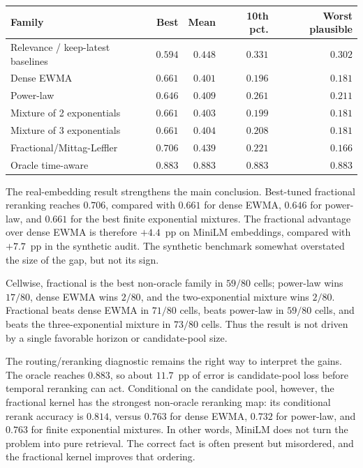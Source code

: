 \documentclass[11pt]{article}
\theoremstyle{plain}
\theoremstyle{definition}
\begin{document}
\begin{center}
\begin{tabular}{@{}lrrrr@{}}
\toprule
Family & Best & Mean & 10th pct. & Worst plausible \\
\midrule
Relevance / keep-latest baselines & $0.594$ & $0.448$ & $0.331$ & $0.302$ \\
Dense EWMA & $0.661$ & $0.401$ & $0.196$ & $0.181$ \\
Power-law & $0.646$ & $0.409$ & $0.261$ & $0.211$ \\
Mixture of 2 exponentials & $0.661$ & $0.403$ & $0.199$ & $0.181$ \\
Mixture of 3 exponentials & $0.661$ & $0.404$ & $0.208$ & $0.181$ \\
Fractional/Mittag-Leffler & $\mathbf{0.706}$ & $0.439$ & $0.221$ & $0.166$ \\
Oracle time-aware & $0.883$ & $0.883$ & $0.883$ & $0.883$ \\
\bottomrule
\end{tabular}
\end{center}

The real-embedding result strengthens the main conclusion.
Best-tuned fractional reranking reaches $0.706$, compared
with $0.661$ for dense EWMA, $0.646$ for power-law, and
$0.661$ for the best finite exponential mixtures.  The
fractional advantage over dense EWMA is therefore
$+4.4$~pp on MiniLM embeddings, compared with $+7.7$~pp in
the synthetic audit.  The synthetic benchmark somewhat
overstated the size of the gap, but not its sign.

Cellwise, fractional is the best non-oracle family in
$59/80$ cells; power-law wins $17/80$, dense EWMA wins
$2/80$, and the two-exponential mixture wins $2/80$.
Fractional beats dense EWMA in $71/80$ cells, beats
power-law in $59/80$ cells, and beats the three-exponential
mixture in $73/80$ cells.  Thus the result is not driven
by a single favorable horizon or candidate-pool size.

The routing/reranking diagnostic remains the right way to
interpret the gains.  The oracle reaches $0.883$, so about
$11.7$~pp of error is candidate-pool loss before temporal
reranking can act.  Conditional on the candidate pool,
however, the fractional kernel has the strongest non-oracle
reranking map: its conditional rerank accuracy is $0.814$,
versus $0.763$ for dense EWMA, $0.732$ for power-law, and
$0.763$ for finite exponential mixtures.  In other words,
MiniLM does not turn the problem into pure retrieval.  The
correct fact is often present but misordered, and the
fractional kernel improves that ordering.
\end{document}
